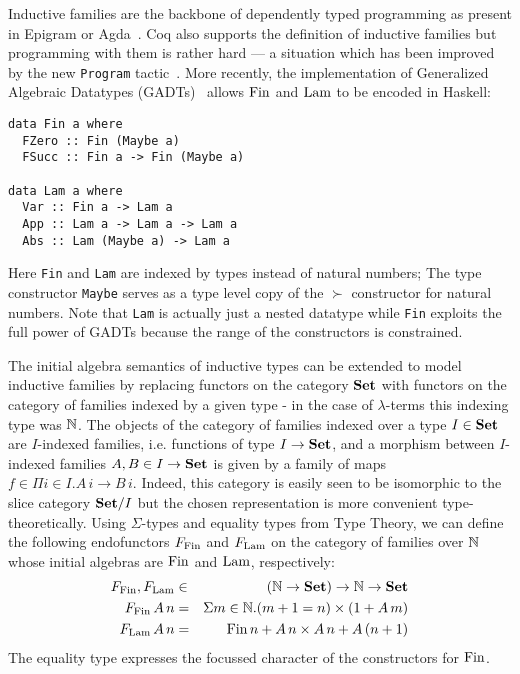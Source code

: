 \documentclass[10pt, conference, compsocconf]{IEEEtran}
\begin{document}
\noindent
Inductive families are the backbone of
dependently typed programming as present in Epigram or
Agda~\cite{Agda}. Coq also supports the definition of inductive families
but programming with them is rather hard --- a situation which has been
improved by the new \texttt{Program} tactic~\cite{sozeau}. 
More recently, the implementation of Generalized Algebraic Datatypes 
(GADTs)~\cite{Hinze:GADT} 
allows $\mathrm{Fin}$ and $\mathrm{Lam}$ to be encoded in Haskell:
\begin{verbatim}
data Fin a where 
  FZero :: Fin (Maybe a)
  FSucc :: Fin a -> Fin (Maybe a)

data Lam a where 
  Var :: Fin a -> Lam a
  App :: Lam a -> Lam a -> Lam a
  Abs :: Lam (Maybe a) -> Lam a
\end{verbatim}
Here \texttt{Fin} and \texttt{Lam} are indexed by types instead of
natural numbers; The type constructor \texttt{Maybe} serves as a type level
copy of the $\succ$ constructor for natural numbers.
Note that \texttt{Lam} is actually just a nested datatype 
\cite{alti:csl99} while \texttt{Fin} exploits the full power of
GADTs because the range of the constructors is constrained.

The initial algebra semantics of inductive types can be extended to
model inductive families by replacing functors on the category $\mathbf{Set}$
with functors on the category of families indexed by a given type - in
the case of $\lambda$-terms this indexing type was $\mathbb{N}$. The objects
of the category of families indexed over a type $I \in \mathbf{Set}$ are
$I$-indexed families, i.e. functions of type $I\to\mathbf{Set}$, and a
morphism between $I$-indexed families $A,B\in I \to\mathbf{Set}$ is given by a
family of maps $f\in\Pi i \in I.A\,i \to B\,i$. Indeed, this category
is easily seen to be isomorphic to the slice category $\mathbf{Set}/ I$ but
the chosen representation is more convenient type-theoretically. Using
$\Sigma$-types and equality types from Type Theory, we can define the
following endofunctors $F_{\mathrm{Fin}}$ and $F_{\mathrm{Lam}}$ on the category of families
over $\mathbb{N}$ whose initial algebras are $\mathrm{Fin}$ and $\mathrm{Lam}$, respectively:
\begin{eqnarray*}
  F_{\mathrm{Fin}},F_{\mathrm{Lam}} & \in & (\mathbb{N}\to\mathbf{Set})\to \mathbb{N}\to\mathbf{Set} \\
  F_{\mathrm{Fin}}\,A\,n & = & \Sigma m\in\mathbb{N}.(m+1=n) \times (1 + A\,m)\\
  F_{\mathrm{Lam}}\,A\,n & = & \mathrm{Fin}\,n + A\,n \times A\, n + A\, (n+1)
\end{eqnarray*}
The equality type expresses the focussed character of the
constructors for $\mathrm{Fin}$. 
\end{document}
